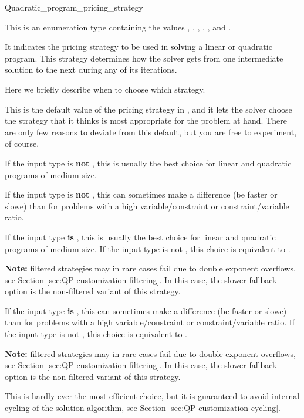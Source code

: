 \begin{ccRefClass}{Quadratic_program_pricing_strategy}


\ccDefinition
This is an enumeration type containing the values
, , 
, ,
, and . 

It indicates the pricing strategy to be used in
solving a linear or quadratic program. This strategy determines
how the solver gets from one intermediate solution to the next
during any of its iterations.

Here we briefly describe when to choose which strategy.

This is the default value of the pricing strategy in
, and it lets the solver choose the
strategy that it thinks is most appropriate for the problem at hand.
There are only few reasons to deviate from this default, but you are
free to experiment, of course.

If the input type is \textbf{not} , this is usually the 
best choice for linear and quadratic programs of medium size.

If the input type is \textbf{not} , this can sometimes
make a difference (be faster or slowe) than  
for problems with a high variable/constraint or constraint/variable ratio.

If the input type \textbf{is} , this is usually the best choice
for linear and quadratic programs of medium size.
If the input type is not , this choice is equivalent 
to .


{\bf Note:} filtered strategies may in rare cases fail due to double 
exponent overflows, see
Section \ref{sec:QP-customization-filtering}. 
In this case, the slower fallback option is
the non-filtered variant  of this strategy.

If the input type \textbf{is} , this can sometimes
make a difference (be faster or slowe) than  
for problems with a high variable/constraint or constraint/variable ratio.
If the input type is not , this choice is equivalent 
to .

{\bf Note:} filtered strategies may in rare cases fail due to double 
exponent overflows, see
Section \ref{sec:QP-customization-filtering}.
In this case, the slower fallback option is
the non-filtered variant  of this strategy.

This is hardly ever the most efficient choice, but it is guaranteed
to avoid internal cycling of the solution algorithm, see
Section \ref{sec:QP-customization-cycling}.

\ccSeeAlso

\end{ccRefClass}
